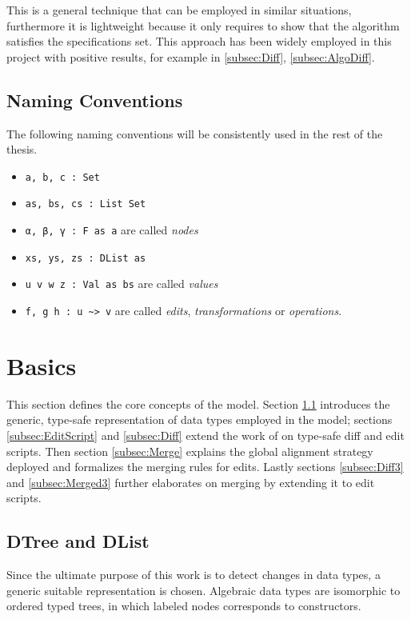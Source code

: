 \documentclass[../Thesis.tex]{subfiles}
\begin{document}
	This is a general technique that can be employed in similar 
	situations, furthermore it is lightweight because it only requires 
	to show that the algorithm satisfies the specifications set.
	This approach has been widely employed in this project with positive 
	results,	 for example in \ref{subsec:Diff}, \ref{subsec:AlgoDiff}.
	
	\subsection{Naming Conventions}
	The following naming conventions will be consistently used in the rest of  
	the thesis.
	\begin{itemize}
		\item \texttt{a, b, c :\ Set}
		\item \texttt{as, bs, cs :\ List Set}
		\item \texttt{α, β, γ :\ F as a} are called \emph{nodes}
		\item \texttt{xs, ys, zs :\ DList as}
		\item \texttt{u v w z :\ Val as bs} are called \emph{values}
		\item \texttt{f, g h :\ u \textasciitilde> v} are called  \emph{edits},
		\emph{transformations} or \emph{operations}.
	\end{itemize}

\section{Basics}
This section defines the core concepts of the model.
Section \ref{subsec:DTree} introduces the generic, type-safe representation of data types employed in the model; sections \ref{subsec:EditScript} and
\ref{subsec:Diff} extend the work of \cite{Lemp09} on type-safe diff and
edit scripts. Then section \ref{subsec:Merge} explains the global
alignment strategy deployed and formalizes the merging rules 
for edits. Lastly sections \ref{subsec:Diff3} and \ref{subsec:Merged3} further elaborates on merging by extending it to edit scripts.

	\subsection{DTree and DList}
	\label{subsec:DTree}
		Since the ultimate purpose of this work is to detect changes in 
		data types, a generic suitable representation is chosen. 
		Algebraic data types are isomorphic to ordered typed trees, in which 
		labeled nodes corresponds to constructors. 
\end{document}
